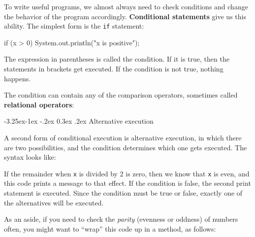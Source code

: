 \documentclass[12pt]{book}
\makeatletter
\renewcommand\subsection{\@startsection{subsection}{2}{\z@}%
    {-3.25ex\@plus -1ex \@minus -.2ex}%
    {0.3ex \@plus .2ex}%
    {\normalfont\large\bfseries}}
\theoremstyle{exercise}
\makeatother
\begin{document}

To write useful programs, we almost always need to check conditions and change the behavior of the program accordingly.
{\bf Conditional statements} give us this ability.
The simplest form is the {\tt if} statement:

\begin{code}
    if (x > 0) {
        System.out.println("x is positive");
    }
\end{code}

The expression in parentheses is called the condition.
If it is true, then the statements in brackets get executed.
If the condition is not true, nothing happens.

The condition can contain any of the comparison operators, sometimes called {\bf relational operators}:


\subsection{Alternative execution}
\label{alternative}


A second form of conditional execution is alternative execution, in which there are two possibilities, and the condition determines which one gets executed.
The syntax looks like:


If the remainder when {\tt x} is divided by 2 is zero, then we know that {\tt x} is even, and this code prints a message to that effect.
If the condition is false, the second print statement is executed.
Since the condition must be true or false, exactly one of the alternatives will be executed.

As an aside, if you need to check the {\em parity} (evenness or oddness) of numbers often, you might want to ``wrap'' this code up in a method, as follows:

\end{document}

